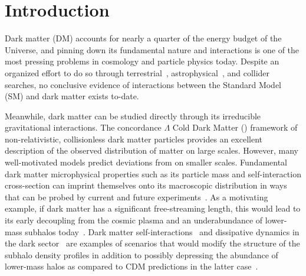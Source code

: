 \documentclass[twocolumn]{aastex63}
\begin{document}

\tableofcontents{}

\section{Introduction}
\label{sec:intro}

Dark matter (DM) accounts for nearly a quarter of the energy budget of the Universe, and pinning down its fundamental nature and interactions is one of the most pressing problems in cosmology and particle physics today. Despite an organized effort to do so through terrestrial~\citep[\eg,][]{2017PhRvL.118b1303A,2017PhRvL.119r1302C,2018PhRvL.121k1302A}, astrophysical~\citep[\eg,][]{2017ApJ...834..110A,2018PhRvD..98l3004C,2018PhRvL.120j1101L}, and collider~\citep[\eg,][]{2017PhLB..769..520S,2019arXiv190301400A} searches, no conclusive evidence of interactions between the Standard Model (SM) and dark matter exists to-date.

Meanwhile, dark matter can be studied directly through its irreducible gravitational interactions.
The concordance $\Lambda$ Cold Dark Matter (\lcdm) framework of non-relativistic, collisionless dark matter particles provides an excellent description of the observed distribution of matter on large scales. However, many well-motivated models predict deviations from \lcdm on smaller scales. Fundamental dark matter microphysical properties such as its particle mass and self-interaction cross-section can imprint themselves onto its macroscopic distribution in ways that can be probed by current and future experiments~\citep{1712.06615,2019arXiv190201055D,1903.04742}. As a motivating example, if dark matter has a significant free-streaming length, this would lead to its early decoupling from the cosmic plasma and an underabundance of lower-mass subhalos today~\citep{1983ApJ...274..443B,2001ApJ...556...93B,astro-ph/0004381,0807.0622,1008.0992}. Dark matter self-interactions~\citep{astro-ph/9909386,astro-ph/0006134,astro-ph/0006218,astro-ph/0205322,1201.5892,1208.3026,1211.6426,1311.6524,1508.03339,1611.02716,1609.08626,1805.03203,1904.10539,1901.00499,1903.01469} and dissipative dynamics in the dark sector~\citep{1303.1521,1702.05482,1706.04195,1707.03829} are examples of scenarios that would modify the structure of the subhalo density profiles in addition to possibly depressing the abundance of lower-mass halos as compared to CDM predictions in the latter case~\citep{1405.2075,1412.4905,1512.05349}.
\end{document}
